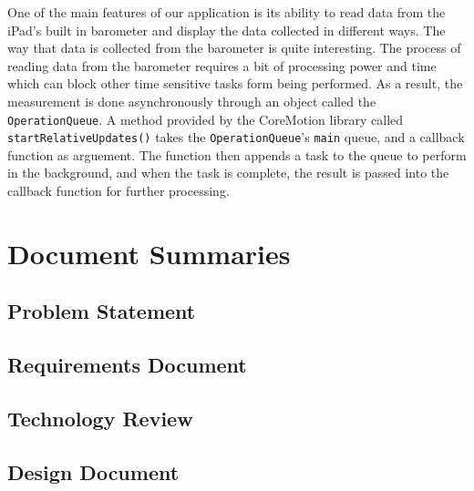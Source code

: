 \documentclass[onecolumn, draftclsnofoot,10pt, compsoc]{IEEEtran}
\begin{document}
One of the main features of our application is its ability to read data from the iPad's built in barometer and display the data collected in different ways.
The way that data is collected from the barometer is quite interesting.
The process of reading data from the barometer requires a bit of processing power and time which can block other time sensitive tasks form being performed.
As a result, the measurement is done asynchronously through an object called the \texttt{OperationQueue}.
A method provided by the CoreMotion library called \texttt{startRelativeUpdates()} takes the \texttt{OperationQueue}'s \texttt{main} queue, and a callback function as arguement.
The function then appends a task to the queue to perform in the background, and when the task is complete, the result is passed into the callback function for further processing.\\

\section{Document Summaries}

\subsection{Problem Statement}

\subsection{Requirements Document}

\subsection{Technology Review}

\subsection{Design Document}
\end{document}
